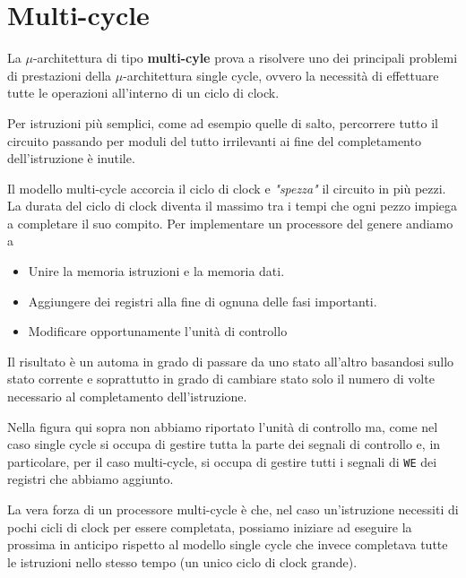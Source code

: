 \section{Multi-cycle}
La $\mu$-architettura di tipo \textbf{multi-cyle} prova a risolvere uno dei principali problemi di
prestazioni della $\mu$-architettura single cycle, ovvero la necessità di effettuare tutte le
operazioni all'interno di un ciclo di clock.

Per istruzioni più semplici, come ad esempio quelle di salto, percorrere tutto il circuito passando
per moduli del tutto irrilevanti ai fine del completamento dell'istruzione è inutile.

Il modello multi-cycle accorcia il ciclo di clock e \emph{"spezza"} il circuito in più pezzi. La
durata del ciclo di clock diventa il massimo tra i tempi che ogni pezzo impiega a completare il suo
compito. Per implementare un processore del genere andiamo a
\begin{itemize}
	\item Unire la memoria istruzioni e la memoria dati.
	\item Aggiungere dei registri alla fine di ognuna delle fasi importanti.
	\item Modificare opportunamente l'unità di controllo
\end{itemize}
Il risultato è un automa in grado di passare da uno stato all'altro basandosi sullo stato corrente
e soprattutto in grado di cambiare stato solo il numero di volte necessario al completamento
dell'istruzione.
\begin{center}
	
\end{center}
Nella figura qui sopra non abbiamo riportato l'unità di controllo ma, come nel caso single cycle
si occupa di gestire tutta la parte dei segnali di controllo e, in particolare, per il caso
multi-cycle, si occupa di gestire tutti i segnali di \verb|WE| dei registri che abbiamo aggiunto.

La vera forza di un processore multi-cycle è che, nel caso un'istruzione necessiti di pochi cicli
di clock per essere completata, possiamo iniziare ad eseguire la prossima in anticipo rispetto al
modello single cycle che invece completava tutte le istruzioni nello stesso tempo (un unico ciclo
di clock grande).